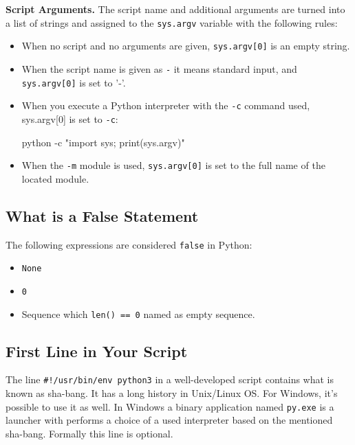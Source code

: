 \documentclass[
]{article}
\newenvironment{Shaded}{}{}
\newcommand{\AttributeTok}[1]{\textcolor[rgb]{0.49,0.56,0.16}{#1}}
\newcommand{\ExtensionTok}[1]{#1}
\newcommand{\StringTok}[1]{\textcolor[rgb]{0.25,0.44,0.63}{#1}}
\begin{document}
\textbf{Script Arguments.} The script name and additional arguments are
turned into a list of strings and assigned to the \texttt{sys.argv}
variable with the following rules:

\begin{itemize}
\item
  When no script and no arguments are given, \texttt{sys.argv{[}0{]}} is
  an empty string.
\item
  When the script name is given as \texttt{-} it means standard input,
  and \texttt{sys.argv{[}0{]}} is set to '-'.
\item
  When you execute a Python interpreter with the \texttt{-c} command
  used, sys.argv{[}0{]} is set to \texttt{-c}:

\begin{Shaded}
\begin{Highlighting}[]
\ExtensionTok{python} \AttributeTok{{-}c} \StringTok{"import sys; print(sys.argv)"}
\end{Highlighting}
\end{Shaded}
\item
  When the \texttt{-m} module is used, \texttt{sys.argv{[}0{]}} is set
  to the full name of the located module.
\end{itemize}

\hypertarget{what-is-a-false-statement}{%
\subsection{What is a False Statement}\label{what-is-a-false-statement}}

The following expressions are considered \texttt{false} in Python:

\begin{itemize}
\item
  \texttt{None}
\item
  \texttt{0}
\item
  Sequence which \texttt{len()\ ==\ 0} named as empty sequence.
\end{itemize}

\hypertarget{first-line-in-your-script}{%
\subsection{First Line in Your Script}\label{first-line-in-your-script}}

The line \texttt{\#!/usr/bin/env\ python3} in a well-developed script
contains what is known as sha-bang. It has a long history in Unix/Linux
OS. For Windows, it's possible to use it as well. In Windows a binary
application named \texttt{py.exe} is a launcher with performs a choice
of a used interpreter based on the mentioned sha-bang. Formally this
line is optional.
\end{document}
